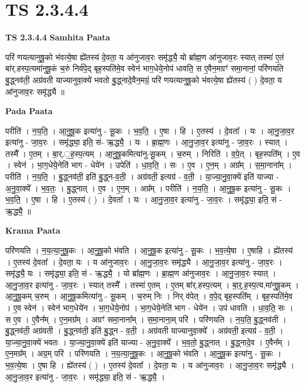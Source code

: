 \documentclass[17pt]{extarticle}
\begin{document}
\section*{ TS 2.3.4.4 }

\textbf{TS 2.3.4.4 } \newline
\textbf{Samhita Paata} \newline

परि॑ णयत्यानुषू॒को भ॑वत्ये॒षा ह्ये॑तस्य॑ दे॒वता॒ य आ॑नुजाव॒रः समृ॑द्ध्यै॒ यो ब्रा᳚ह्म॒ण आ॑नुजाव॒रः स्यात् तस्मा॑ ए॒तं बा॑र्.हस्प॒त्यमा॑नुषू॒कं च॒रुं निर्व॑पे॒द् बृह॒स्पति॑मे॒व स्वेन॑ भाग॒धेये॒नोप॑ धावति॒ स ए॒वैन॒मग्रꣳ॑ समा॒नानां॒ परि॑णयति बु॒द्ध्नव॑ती॒ अग्र॑वती याज्यानुवा॒क्ये॑ भवतो बु॒द्ध्नादे॒वैन॒मग्रं॒ परि॑ णयत्यानुषू॒को भ॑वत्ये॒षा ह्ये॑तस्य॑ ( ) दे॒वता॒ य आ॑नुजाव॒रः समृ॑द्ध्यै ॥ \newline

\textbf{Pada Paata} \newline

परीति॑ । न॒य॒ति॒ । आ॒नु॒षू॒क इत्या॑नु - सू॒कः । भ॒व॒ति॒ । ए॒षा । हि । ए॒तस्य॑ । दे॒वता᳚ । यः । आ॒नु॒जा॒व॒र इत्या॑नु - जा॒व॒रः । समृ॑द्ध्या॒ इति॒ सं- ऋ॒द्ध्यै॒ । यः । ब्रा॒ह्म॒णः । आ॒नु॒जा॒व॒र इत्या॑नु - जा॒व॒रः । स्यात् । तस्मै᳚ । ए॒तम् । बा॒र्.॒ह॒स्प॒त्यम् । आ॒नु॒षू॒कमित्या॑नु-सू॒कम् । च॒रुम् । निरिति॑ । व॒पे॒त् । बृह॒स्पति᳚म् । ए॒व । स्वेन॑ । भा॒ग॒धेये॒नेति॑ भाग - धेये॑न । उपेति॑ । धा॒व॒ति॒ । सः । ए॒व । ए॒न॒म् । अग्र᳚म् । स॒मा॒नाना᳚म् । परीति॑ । न॒य॒ति॒ । बु॒द्ध्नव॑ती॒ इति॑ बु॒द्ध्न-व॒ती॒ । अग्र॑वती॒ इत्यग्र॑ - व॒ती॒ । या॒ज्या॒नु॒वा॒क्ये॑ इति॑ याज्या - अ॒नु॒वा॒क्ये᳚ । भ॒व॒तः॒ । बु॒द्ध्नात् । ए॒व । ए॒न॒म् । अग्र᳚म् । परीति॑ । न॒य॒ति॒ । आ॒नु॒षू॒क इत्या॑नु - सू॒कः । भ॒व॒ति॒ । ए॒षा । हि । ए॒तस्य॑ ( ) । दे॒वता᳚ । यः । आ॒नु॒जा॒व॒र इत्या॑नु - जा॒व॒रः । समृ॑द्ध्या॒ इति॒ सं - ऋ॒द्ध्यै॒ ॥  \newline


\textbf{Krama Paata} \newline

परि॑णयति । न॒य॒त्या॒नु॒षू॒कः । आ॒नु॒षू॒को भ॑वति । आ॒नु॒षू॒क इत्या॑नु - सू॒कः । भ॒व॒त्ये॒षा । ए॒षाहि । ह्ये॑तस्य॑ । ए॒तस्य॑ दे॒वता᳚ । दे॒वता॒ यः । य आ॑नुजाव॒रः । आ॒नु॒जा॒व॒रः समृ॑द्ध्यै । आ॒नु॒जा॒व॒र इत्या॑नु - जा॒व॒रः । समृ॑द्ध्यै॒ यः । समृ॑द्ध्या॒ इति॒ सं - ऋ॒द्ध्यै॒ । यो ब्रा᳚ह्म॒णः । ब्रा॒ह्म॒ण आ॑नुजाव॒रः । आ॒नु॒जा॒व॒रः स्यात् । आ॒नु॒जा॒व॒र इत्या॑नु - जा॒व॒रः । स्यात् तस्मै᳚ । तस्मा॑ ए॒तम् । ए॒तम् बा॑र्.हस्प॒त्यम् । बा॒र्॒.ह॒स्प॒त्य,मा॑नुषू॒कम् । आ॒नु॒षू॒कम् च॒रुम् । आ॒नु॒षू॒कमित्या॑नु - सू॒कम् । च॒रुम् निः । निर् व॑पेत् । व॒पे॒द् बृह॒स्पति᳚म् । बृह॒स्पति॑मे॒व । ए॒व स्वेन॑ । स्वेन॑ भाग॒धेये॑न । भा॒ग॒धेये॒नोप॑ । भा॒ग॒धेये॒नेति॑ भाग - धेये॑न । उप॑ धावति । धा॒व॒ति॒ सः । स ए॒व । ए॒वैन᳚म् । ए॒न॒मग्र᳚म् । अग्रꣳ॑ समा॒नाना᳚म् । स॒मा॒नाना॒म् परि॑ । परि॑णयति । न॒य॒ति॒ बु॒द्ध्नव॑ती । बु॒द्ध्नव॑ती॒ अग्र॑वती । बु॒द्ध्नव॑ती॒ इति॑ बु॒द्ध्न - व॒ती॒ । अग्र॑वती याज्यानुवा॒क्ये᳚ । अग्र॑वती॒ इत्यग्र॑ - व॒ती॒ । या॒ज्या॒नु॒वा॒क्ये॑ भवतः । या॒ज्या॒नु॒वा॒क्ये॑ इति॑ याज्या - अ॒नु॒वा॒क्ये᳚ । भ॒व॒तो॒ बु॒द्ध्नात् । बु॒द्ध्नादे॒व । ए॒वैन᳚म् । ए॒न॒मग्र᳚म् । अग्र॒म् परि॑ । परि॑णयति । न॒य॒त्या॒नु॒षू॒कः । आ॒नु॒षू॒को भ॑वति । आ॒नु॒षू॒क इत्या॑नु - सू॒कः । भ॒व॒त्ये॒षा । ए॒षा हि । ह्ये॑तस्य॑ ( ) । ए॒तस्य॑ दे॒वता᳚ । दे॒वता॒ यः । य आ॑नुजाव॒रः । आ॒नु॒जा॒व॒रः समृ॑द्ध्यै । आ॒नु॒जा॒व॒र इत्या॑नु - जा॒व॒रः । समृ॑द्ध्या॒ इति॒ सं - ऋ॒द्ध्यै॒ । \newline
\end{document}
